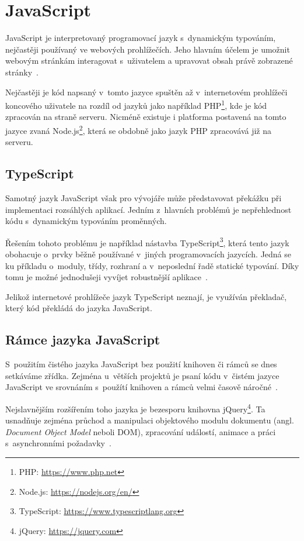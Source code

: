 \section{JavaScript}
JavaScript je interpretovaný programovací jazyk s~dynamickým typováním, nejčastěji používaný ve webových prohlížečích. Jeho hlavním účelem je umožnit webovým stránkám interagovat s~uživatelem a upravovat obsah právě zobrazené stránky~\cite{bib:js-definitive}.

Nejčastěji je kód napsaný v~tomto jazyce spuštěn až v~internetovém prohlížeči koncového uživatele na rozdíl od jazyků jako například PHP\footnote{PHP: \url{https://www.php.net}}, kde je kód zpracován na straně serveru. Nicméně existuje i platforma postavená na tomto jazyce zvaná Node.js\footnote{Node.js: \url{https://nodejs.org/en/}}, která se obdobně jako jazyk PHP zpracovává již na serveru.


\subsection{TypeScript}
Samotný jazyk JavaScript však pro vývojáře může představovat překážku při implementaci rozsáhlých aplikací. Jedním z~hlavních problémů je nepřehlednost kódu s~dynamickým typováním proměnných.

Řešením tohoto problému je například nástavba TypeScript\footnote{TypeScript: \url{https://www.typescriptlang.org}}, která tento jazyk obohacuje o~prvky běžně používané v~jiných programovacích jazycích. Jedná se ku příkladu o~moduly, třídy, rozhraní a v~neposlední řadě statické typování. Díky tomu je možné jednodušeji vyvíjet robustnější aplikace~\cite{bib:typescript}.
 
Jelikož internetové prohlížeče jazyk TypeScript neznají, je využíván překladač, který kód překládá do jazyka JavaScript.


\subsection{Rámce jazyka JavaScript}
S~použitím čistého jazyka JavaScript bez použití knihoven či rámců se dnes setkáváme zřídka. Zejména u~větších projektů je psaní kódu v~čistém jazyce JavaScript ve srovnáním s~použítí knihoven a rámců velmi časově náročné~\cite{bib:vanilla-js}.

Nejslavnějším rozšířením toho jazyka je bezesporu knihovna jQuery\footnote{jQuery: \url{https://jquery.com}}. Ta usnadňuje zejména průchod a manipulaci objektového modulu dokumentu (angl. \emph{Document Object Model} neboli DOM), zpracování událostí, animace a práci s~asynchronními požadavky~\cite{bib:jquery}.

